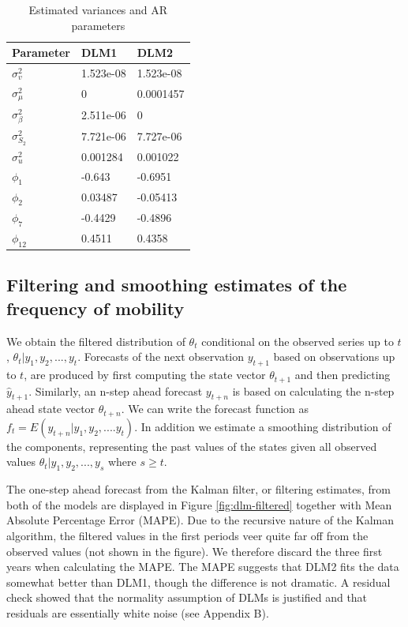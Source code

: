 \documentclass[12pt, a4paper]{article}
\begin{document}
\begin{table}[H]

\caption{\label{tab:estimated-parameters}Estimated variances and AR parameters}
\centering
\begin{tabular}{lll}
\toprule
Parameter & DLM1 & DLM2\\
\midrule
$\sigma_{v}^{2}$ & 1.523e-08 & 1.523e-08\\
$\sigma_{\mu}^{2}$ & 0 & 0.0001457\\
$\sigma_{\beta}^{2}$ & 2.511e-06 & 0\\
$\sigma_{S_{2}}^{2}$ & 7.721e-06 & 7.727e-06\\
$\sigma^{2}_{u}$ & 0.001284 & 0.001022\\
$\phi_{1}$ & -0.643 & -0.6951\\
$\phi_{2}$ & 0.03487 & -0.05413\\
$\phi_{7}$ & -0.4429 & -0.4896\\
$\phi_{12}$ & 0.4511 & 0.4358\\
\bottomrule
\end{tabular}
\end{table}

\subsection{Filtering and smoothing estimates of the frequency of
mobility}\label{filtering-and-smoothing-estimates-of-the-frequency-of-mobility}

We obtain the filtered distribution of $\theta_{t}$ conditional on the
observed series up to $t$, $\theta_{t} | y_{1}, y_{2},...,y_{t}$.
Forecasts of the next observation $y_{t+1}$ based on observations up
to $t$, are produced by first computing the state vector
$\theta_{t+1}$ and then predicting $\hat{y}_{t+1}$. Similarly, an n-step
ahead forecast $y_{t+n}$ is based on calculating the n-step ahead
state vector $\theta_{t+n}$. We can write the forecast function as
$f_{t} = E(y_{t+n} | y_{1}, y_{2}, ....y_{t})$. In addition we
estimate a smoothing distribution of the components, representing the
past values of the states given all observed values
$\theta_{t} | y_{1}, y_{2},...,y_{s}$ where $s \ge t$.

The one-step ahead forecast from the Kalman filter, or filtering estimates, from both of the models are displayed in Figure
\ref{fig:dlm-filtered} together with Mean Absolute Percentage Error (MAPE).
Due to the recursive nature of the Kalman algorithm, the filtered values
in the first periods veer quite far off from the observed values (not
shown in the figure). We therefore discard the three first years when
calculating the MAPE. The MAPE suggests that DLM2 fits the
data somewhat better than DLM1, though the difference is not
dramatic. A residual check showed that the normality assumption of
DLMs is justified and that residuals are essentially white noise (see Appendix B).
\end{document}
